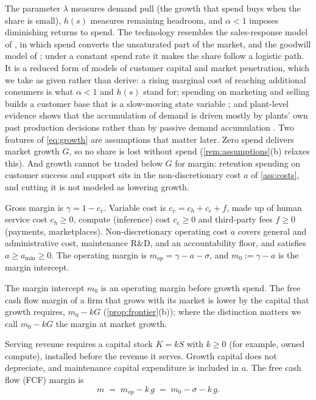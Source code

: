 The parameter $\lambda$ measures demand pull (the growth that spend buys when the share is small), $h(s)$ measures remaining headroom, and $\alpha<1$ imposes diminishing returns to spend. The technology resembles the sales-response model of \citet{vidale1957operations}, in which spend converts the unsaturated part of the market, and the goodwill model of \citet{nerlove1962optimal}; under a constant spend rate it makes the share follow a logistic path. It is a reduced form of models of customer capital and market penetration, which we take as given rather than derive: a rising marginal cost of reaching additional consumers \citep{arkolakis2010market} is what $\alpha<1$ and $h(s)$ stand for; spending on marketing and selling builds a customer base that is a slow-moving state variable \citep{gourio2014customer,drozd2012understanding}; and plant-level evidence shows that the accumulation of demand is driven mostly by plants' own past production decisions rather than by passive demand accumulation \citep{foster2016slow}. Two features of \eqref{eq:growth} are assumptions that matter later. Zero spend delivers market growth $G$, so no share is lost without spend (\autoref{rem:assumptions}(b) relaxes this). And growth cannot be traded below $G$ for margin: retention spending on customer success and support sits in the non-discretionary cost $a$ of \autoref{ass:costs}, and cutting it is not modeled as lowering growth.

\begin{assumption}[Costs]\label{ass:costs}
Gross margin is $\gamma=1-c_v$. Variable cost is $c_v=c_h+c_c+f$, made up of human service cost $c_h\ge 0$, compute (inference) cost $c_c\ge 0$ and third-party fees $f\ge 0$ (payments, marketplaces). Non-discretionary operating cost $a$ covers general and administrative cost, maintenance R\&D, and an accountability floor, and satisfies $a\ge a_{\min}\ge 0$. The operating margin is $m_{op}=\gamma-a-\sigma$, and $m_0:=\gamma-a$ is the margin intercept.
\end{assumption}

The margin intercept $m_0$ is an operating margin before growth spend. The free cash flow margin of a firm that grows with its market is lower by the capital that growth requires, $m_0-kG$ (\autoref{prop:frontier}(b)); where the distinction matters we call $m_0-kG$ the margin at market growth.

\begin{assumption}[Capital]\label{ass:capital}
Serving revenue requires a capital stock $K=kS$ with $k\ge 0$ (for example, owned compute), installed before the revenue it serves. Growth capital does not depreciate, and maintenance capital expenditure is included in $a$. The free cash flow (FCF) margin is
\begin{equation}\label{eq:fcf}
m \;=\; m_{op}-k\,g \;=\; m_0-\sigma-k\,g .
\end{equation}
\end{assumption}

